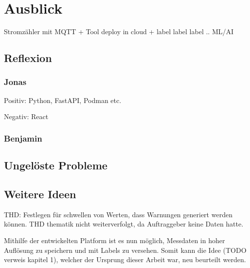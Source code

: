 \chapter{Ausblick}

Stromzähler mit MQTT + Tool deploy in cloud + label label label
..
ML/AI

\section{Reflexion}
\subsection{Jonas}
Positiv: Python, FastAPI, Podman etc.

Negativ:
React

\subsection{Benjamin}
\section{Ungelöste Probleme}



\section{Weitere Ideen}
THD: Festlegen für schwellen von Werten, dass Warnungen generiert werden können.
THD thematik nicht weiterverfolgt, da Auftraggeber keine Daten hatte.

Mithilfe der entwickelten Platform ist es nun möglich, Messdaten in hoher Auflösung zu speichern
und mit Labels zu versehen. Somit kann die Idee (TODO verweis kapitel 1), welcher der Ursprung dieser
Arbeit war, neu beurteilt werden. 


